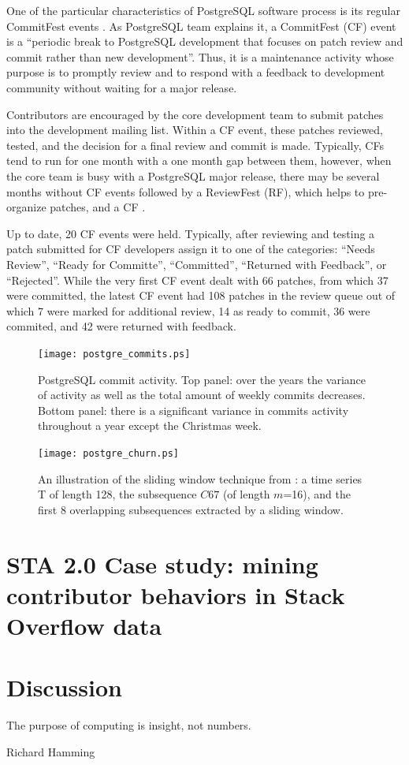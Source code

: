 One of the particular characteristics of PostgreSQL software process is its regular CommitFest events \cite{postgre-commitfest}.
As PostgreSQL team explains it, a CommitFest (CF) event is a ``periodic break to PostgreSQL development that focuses on patch 
review and commit rather than new development''.  Thus, it is a maintenance activity whose purpose is to promptly review 
and to respond with a feedback to development community without waiting for a major release. 

Contributors are encouraged by the core development team to submit patches into the development mailing list. Within a CF event, 
these patches reviewed, tested, and the decision for a final review and commit is made.  Typically, CFs tend to run for one month 
with a one month gap between them, however, when the core team is busy with a PostgreSQL major release, there may be several 
months without CF events followed by a ReviewFest (RF), which helps to pre-organize patches, and a CF . 

Up to date, 20 CF events were held. Typically, after reviewing and testing a patch submitted for CF developers assign it to one of the 
categories: ``Needs Review'', ``Ready for Committe'', ``Committed'', ``Returned with Feedback'', or ``Rejected''. 
While the very first CF event dealt with 66 patches, from which 37 were committed, the latest CF event had 108 patches in the review 
queue out of which 7 were marked for additional review, 14 as ready to commit, 36 were commited, and 42 were returned with feedback.

\begin{figure}[h]
   \centering
   \texttt{[image: postgre\_commits.ps]}
   \caption{PostgreSQL commit activity. Top panel: over the years the variance of activity as well as the total amount of weekly commits decreases.
   Bottom panel: there is a significant variance in commits activity throughout a year except the Christmas week.}
   \label{fig:postgre_commits}
\end{figure}

\begin{figure}[h]
   \centering
   \texttt{[image: postgre\_churn.ps]}
   \caption{An illustration of the sliding window technique from \cite{citeulike:2821475}: a time series T of length 128, 
   the subsequence $C67$ (of length $m$=16), and the first 8 overlapping subsequences extracted by a sliding window.}
   \label{fig:postgre_churn}
\end{figure}



\section{STA 2.0 Case study: mining contributor behaviors in Stack Overflow data}


\section{Discussion}

\epigraph{The purpose of computing is insight, not numbers.}{Richard Hamming}
